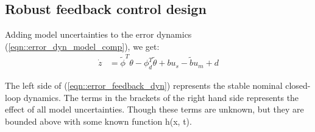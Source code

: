 \subsection{Robust feedback control design}

Adding model uncertainties to the error dynamics
(\ref{eqn::error_dyn_model_comp}), we get:
\begin{align}
    \dot z &= \tilde \phi^T \theta - \phi^T_d \tilde \theta + bu_s - \tilde b u_m  + d\label{eqn::error_dyn_model_comp_unc}
\end{align}

The left side of (\ref{eqn::error_feedback_dyn}) represents the stable nominal
closed-loop dynamics. The terms in the brackets of the right hand side
represents the effect of all model uncertainties. Though these terms are
unknown, but they are bounded above with some known function h(x, t).
